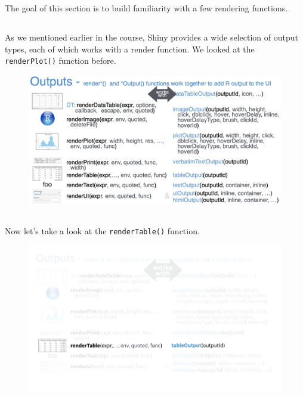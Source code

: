 \documentclass[
  letterpaper,
  DIV=11,
  numbers=noendperiod]{scrreprt}
\begin{document}
The goal of this section is to build familiarity with a few rendering
functions.

\hypertarget{section-36}{%
\subsection{}\label{section-36}}

As we mentioned earlier in the course, Shiny provides a wide selection
of output types, each of which works with a render function. We looked
at the \texttt{renderPlot()} function before.

\begin{figure}

{\centering \includegraphics[width=1\textwidth,height=\textheight]{./images/cheatsheet-outputs.png}

}

\end{figure}

\hypertarget{section-37}{%
\subsection{}\label{section-37}}

Now let's take a look at the \texttt{renderTable()} function.

\begin{figure}

{\centering \includegraphics[width=1\textwidth,height=\textheight]{./images/cheatsheet-renderTable.png}

}

\end{figure}
\end{document}
